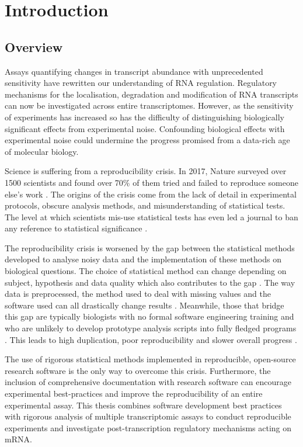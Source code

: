 \documentclass[../main.tex]{subfiles}
\begin{document}
\chapter{{Introduction}}
\onehalfspacing

\section{Overview}

Assays quantifying changes in transcript abundance with unprecedented sensitivity have rewritten our understanding of RNA regulation.
Regulatory mechanisms for the localisation, degradation and modification of RNA transcripts can now be investigated across entire transcriptomes.
However, as the sensitivity of experiments has increased so has the difficulty of distinguishing biologically significant effects from experimental noise.
Confounding biological effects with experimental noise could undermine the progress promised from a data-rich age of molecular biology.

Science is suffering from a reproducibility crisis. 
In 2017, Nature surveyed over 1500 scientists and found over 70\% of them tried and failed to reproduce someone else's work \parencite{Baker2016}.
The origins of the crisis come from the lack of detail in experimental protocols, obscure analysis methods, and misunderstanding of statistical tests.
The level at which scientists mis-use statistical tests has even led a journal to ban any reference to statistical significance \parencite{Trafimow2015}.

The reproducibility crisis is worsened by the gap between the statistical methods developed to analyse noisy data and the implementation of these methods on biological questions.
The choice of statistical method can change depending on subject, hypothesis and data quality which also contributes to the gap \parencite{Ching2018}.
The way data is preprocessed, the method used to deal with missing values and the software used can all drastically change results \parencite{Ioannidis2009}.
Meanwhile, those that bridge this gap are typically biologists with no formal software engineering training \parencite{Attwood2019} and who are unlikely to develop prototype analysis scripts into fully fledged programs \parencite{Prins2015}. 
This leads to high duplication, poor reproducibility and slower overall progress \parencite{Lawlor2015}.

The use of rigorous statistical methods implemented in reproducible, open-source research software is the only way to overcome this crisis.
Furthermore, the inclusion of comprehensive documentation with research software can encourage experimental best-practices and improve the reproducibility of an entire experimental assay.
This thesis combines software development best practices with rigorous analysis of multiple transcriptomic assays to conduct reproducible experiments and investigate post-transcription regulatory mechanisms acting on mRNA. 
\end{document}
